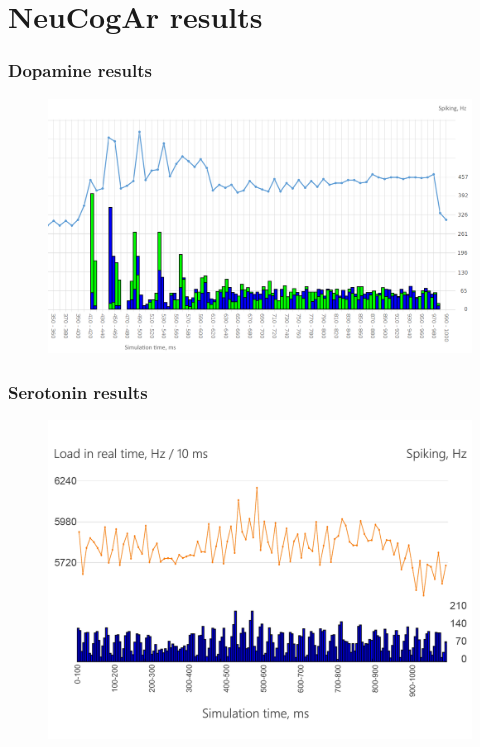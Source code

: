 \documentclass[12pt, aspectratio=169]{beamer}
\begin{document}
\section{NeuCogAr results}

\begin{frame}
\frametitle{Dopamine results}
\begin{figure}
\includegraphics[width=0.8\linewidth]{resultBIG_short}
\end{figure}
\end{frame}


\begin{frame}
\frametitle{Serotonin results}
\begin{figure}
\includegraphics[width=0.8\linewidth]{5ht_results}
\end{figure}
\end{frame}

\end{document}
